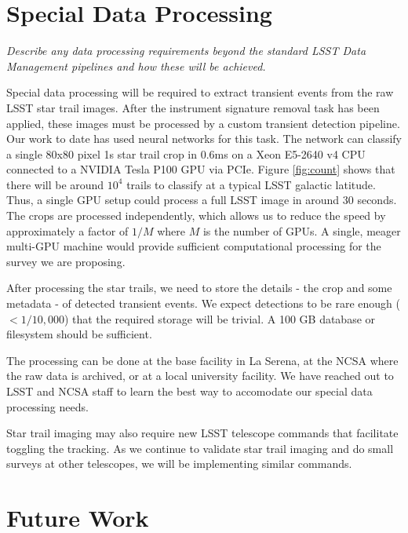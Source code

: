 \documentclass[12pt, letterpaper]{article}
\begin{document}
\vspace{.6in}

\section{Special Data Processing}
\begin{footnotesize}
{\it Describe any data processing requirements beyond the standard LSST Data Management pipelines and how these will be achieved.}
\end{footnotesize}

Special data processing will be required to extract transient events from the raw LSST star trail images. After the instrument signature removal task has been applied, these images must be processed by a custom transient detection pipeline. Our work to date has used neural networks for this task. The network can classify a single 80x80 pixel 1s star trail crop in 0.6ms on a Xeon E5-2640 v4 CPU connected to a NVIDIA Tesla P100 GPU via PCIe. Figure \ref{fig:count} shows that there will be around $10^4$ trails to classify at a typical LSST galactic latitude. Thus, a single GPU setup could process a full LSST image in around 30 seconds. The crops are processed independently, which allows us to reduce the speed by approximately a factor of $1/M$ where $M$ is the number of GPUs. A single, meager multi-GPU machine would provide sufficient computational processing for the survey we are proposing.

After processing the star trails, we need to store the details - the crop and some metadata - of detected transient events. We expect detections to be rare enough ($< 1/10,000$) that the required storage will be trivial. A 100 GB database or filesystem should be sufficient. 

The processing can be done at the base facility in La Serena, at the NCSA where the raw data is archived, or at a local university facility. We have reached out to LSST and NCSA staff to learn the best way to accomodate our special data processing needs.

Star trail imaging may also require new LSST telescope commands that facilitate toggling the tracking. As we continue to validate star trail imaging and do small surveys at other telescopes, we will be implementing similar commands.

\section{Future Work}
\label{sec:future}
\end{document}
